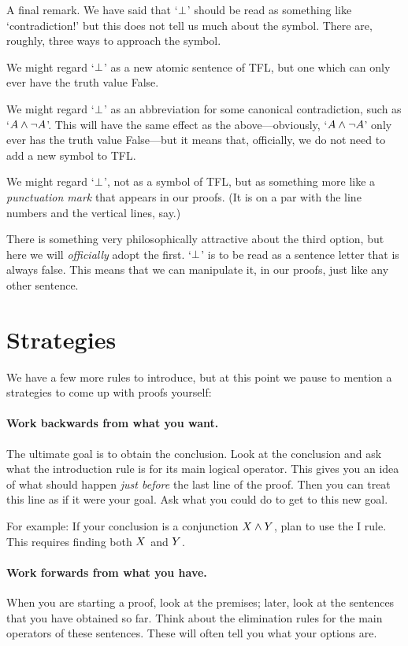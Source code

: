 A final remark. We have said that `$\bot$' should be read as something like `contradiction!' but this does not tell us much about the symbol. There are, roughly, three ways to approach the symbol.
	\begin{ebullet}
		\item We might regard `$\bot$' as a new atomic sentence of TFL, but one which can only ever have the truth value False.
		\item We might regard `$\bot$' as an abbreviation for some canonical contradiction, such as `$A \mathbin{\wedge} \neg A$'. This will have the same effect as the above---obviously, `$A \mathbin{\wedge} \neg A$' only ever has the truth value False---but it means that, officially, we do not need to add a new symbol to TFL.
		\item We might regard `$\bot$', not as a symbol of TFL, but as something more like a \emph{punctuation mark} that appears in our proofs. (It is on a par with the line numbers and the vertical lines, say.)
	\end{ebullet}
There is something very philosophically attractive about the third option, but here we will \emph{officially} adopt the first. `$\bot$' is to be read as a sentence letter that is always false. This means that we can manipulate it, in our proofs, just like any other sentence.

\section{Strategies}
We have a few more rules to introduce, but at this point we pause to mention a strategies to come up with proofs yourself:

\paragraph{Work backwards from what you want.}
The ultimate goal is to obtain the conclusion. Look at the conclusion and ask what the introduction rule is for its main logical operator. This gives you an idea of what should happen \emph{just before} the last line of the proof. Then you can treat this line as if it were your goal. Ask what you could do to get to this new goal.

For example: If your conclusion is a conjunction $X\mathbin{\wedge}Y$, plan to use the {\eand}I rule. This requires finding both $X$ and $Y$.

\paragraph{Work forwards from what you have.}
When you are starting a proof, look at the premises; later, look at the sentences that you have obtained so far. Think about the elimination rules for the main operators of these sentences. These will often tell you what your options are.

